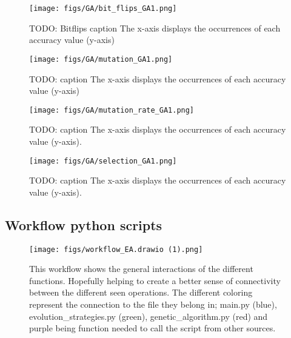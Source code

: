 \documentclass{article}
\begin{document}
\begin{figure*}[htbp]
    \centering
    \texttt{[image: figs/GA/bit\_flips\_GA1.png]}
    \caption{
    TODO: Bitflips caption
    The x-axis displays the occurrences of each accuracy value (y-axis)
    }
    \label{fig:A_GA_bitflip}
\end{figure*}


\begin{figure*}[htbp]
    \centering
    \texttt{[image: figs/GA/mutation\_GA1.png]}
    \caption{
    TODO: caption 
    The x-axis displays the occurrences of each accuracy value (y-axis)
    }
    \label{fig:A_GA_mutation}
\end{figure*}


\begin{figure}[H]
    \hspace*{-1.5 cm} 
    \centering
    \texttt{[image: figs/GA/mutation\_rate\_GA1.png]}
    \caption{
    TODO: caption
    The x-axis displays the occurrences of each accuracy value (y-axis). }
    \label{fig:GA_mutation_rate}
\end{figure}


\begin{figure}[H]
    \centering
    \texttt{[image: figs/GA/selection\_GA1.png]}
    \caption{
    TODO: caption
    The x-axis displays the occurrences of each accuracy value (y-axis). }
    \label{fig:GA_selection}
\end{figure}




\newpage
\subsection{Workflow python scripts}

\begin{figure}[htbp]
    \centering
    \texttt{[image: figs/workflow\_EA.drawio (1).png]}
    \caption{ 
    This workflow shows the general interactions of the different functions. 
    Hopefully helping to create a better sense of connectivity between the different seen operations. 
    The different coloring represent the connection to the file they belong in; 
    main.py (blue), evolution\_strategies.py (green), genetic\_algorithm.py (red) and purple being function needed to call the script from other sources.
    }
    \label{fig:A_workflow}
\end{figure}
\end{document}

